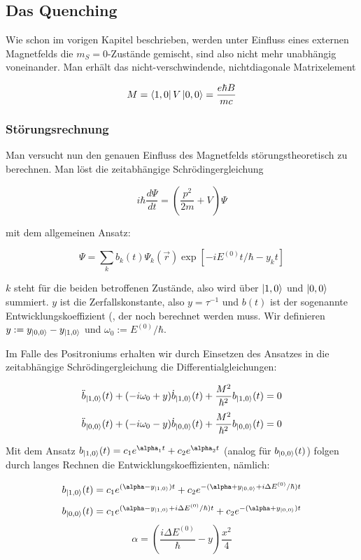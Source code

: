 \subsection{Das Quenching}

Wie schon im vorigen Kapitel beschrieben, werden unter Einfluss eines externen Magnetfelds die $m_S = 0$-Zustände gemischt, sind also nicht mehr unabhängig voneinander. Man erhält das nicht-verschwindende, nichtdiagonale Matrixelement 

$$ M = \bra{1,0} V \ket{0,0} = \frac{e\hbar B}{mc} $$

\subsubsection{Störungsrechnung}

Man versucht nun den genauen Einfluss des Magnetfelds störungstheoretisch zu berechnen. Man löst die zeitabhängige Schrödingergleichung

$$ i\hbar \frac{d\Psi}{dt} = (\frac{p^2}{2m}+V)\Psi $$

mit dem allgemeinen Ansatz:

$$ \Psi = \sum_{k} b_k(t)\Psi_k(\vec r)\exp\left[-iE^{(0)}t/\hbar-y_kt\right] $$

$k$ steht für die beiden betroffenen Zustände, also wird über $\ket{1,0}$ und $\ket{0,0}$ summiert. $y$ ist die Zerfallskonstante, also $y = \tau^{-1}$ und $b(t)$ ist der sogenannte Entwicklungskoeffizient (, der noch berechnet werden muss. Wir definieren $y:=y_{\ket{0,0}}-y_{\ket{1,0}}$ und $\omega_0 := E^{(0)}/\hbar$. 

Im Falle des Positroniums erhalten wir durch Einsetzen des Ansatzes in die zeitabhängige Schrödingergleichung die Differentialgleichungen:

$$\ddot b_{\ket{1,0}}(t) + (-i\omega_0 + y) \dot b_{\ket{1,0}}(t) + \frac{M^2}{\hbar^2}b_{\ket{1,0}}(t) = 0$$
$$\ddot b_{\ket{0,0}}(t) + (-i\omega_0 - y) \dot b_{\ket{0,0}}(t) + \frac{M^2}{\hbar^2}b_{\ket{0,0}}(t) = 0$$

Mit dem Ansatz $b_{\ket{1,0}}(t) = c_1e^{\alpha_1t} + c_2e^{\alpha_2t}$ (analog für $b_{\ket{0,0}}(t)$) folgen durch langes Rechnen die Entwicklungskoeffizienten, nämlich:

$$ b_{\ket{1,0}}(t) = c_1e^{(\alpha -y_{\ket{1,0}})t} + c_2e^{-(\alpha + y_{\ket{0,0}}+ i\Delta E^{(0)}/\hbar)t} $$
$$ b_{\ket{0,0}}(t) = c_1e^{(\alpha -y_{\ket{1,0}} + i\Delta E^{(0)}/\hbar)t} + c_2e^{-(\alpha + y_{\ket{0,0}})t} $$
$$ \alpha = \left(\frac{i\Delta E^{(0)}}{\hbar} - y\right)\frac{x^2}{4} $$

